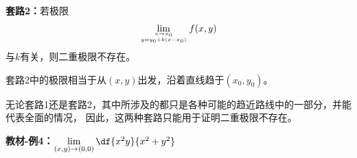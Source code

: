 \begin{center}
	\quad
\end{center}

{\bf 套路2：}若极限
$$\lim\limits_{{x\to x_0}\atop{y=y_0+k(x-x_0)}}f(x,y)$$
与$k$有关，则二重极限不存在。

套路2中的极限相当于从$(x,y)$出发，沿着直线趋于$(x_0,y_0)$。

无论套路1还是套路2，其中所涉及的都只是各种可能的趋近路线中的一部分，并能代表全面的情况，
因此，这两种套路只能用于证明二重极限不存在。

{\bf 教材-例4：}$\lim\limits_{(x,y)\to(0,0)}\df{x^2y}{x^2+y^2}$

